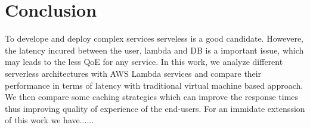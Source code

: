 \section{Conclusion}\label{conlsn}
To develope and deploy complex services serveless is a good candidate. Howevere, the latency incured between the user, lambda and DB is a important issue, which may leads to the less QoE for any service. In this work, we analyze different serverless architectures with AWS Lambda services and compare their performance in terms of latency with traditional virtual machine based approach. We then compare some caching strategies which can improve the response times thus improving quality of experience of the end-users.  
For an immidate extenssion of this work we have......
